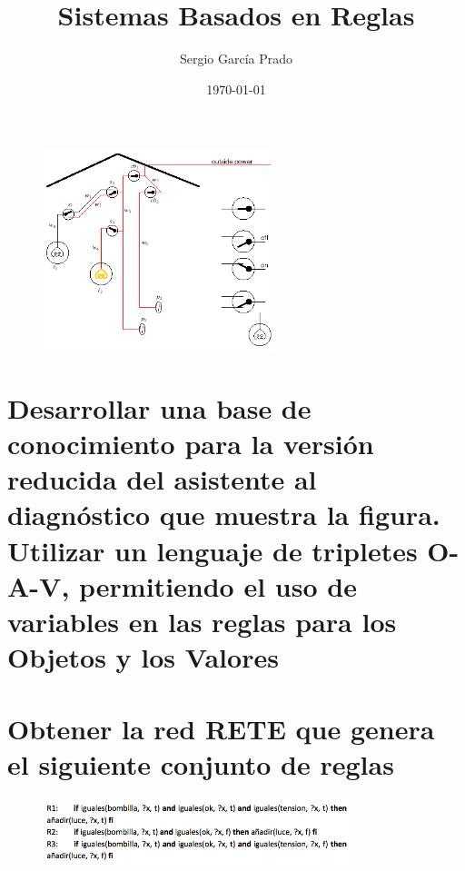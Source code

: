 \documentclass[10pt, a4paper,spanish]{article}
\title{\vspace{-15mm}\fontsize{24pt}{10pt}\selectfont\textbf{Sistemas Basados en Reglas}} %
\author{Sergio García Prado}
\date{\today}
\begin{document}
	\maketitle %

	\thispagestyle{fancy} %


	\begin{figure}[H]
		\begin{center}
			\includegraphics[width=0.6\textwidth]{diagnostic-assistant}
		\end{center}
	\end{figure}


	\section{Desarrollar una base de conocimiento para la versión reducida del asistente al diagnóstico que muestra la figura. Utilizar un lenguaje de tripletes O-A-V, permitiendo el uso de variables en las reglas para los Objetos y los Valores}

		\paragraph{}


	\section{Obtener la red RETE que genera el siguiente conjunto de reglas}

		\begin{figure}[H]
			\begin{center}
				\includegraphics[width=0.8\textwidth]{rete-exercise}
			\end{center}
		\end{figure}
\end{document}
